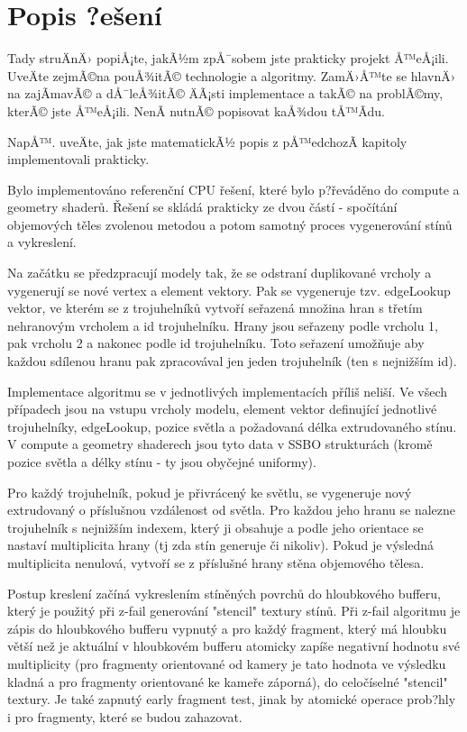 \documentclass[a4paper, 12pt]{article}
\begin{document}
\section{Popis ?ešení­}

Tady struÄnÄ› popiÅ¡te, jakÃ½m zpÅ¯sobem jste prakticky projekt Å™eÅ¡ili. UveÄte zejmÃ©na pouÅ¾itÃ©
technologie a algoritmy. ZamÄ›Å™te se hlavnÄ› na zajÃ­mavÃ© a dÅ¯leÅ¾itÃ© ÄÃ¡sti implementace a takÃ© na
problÃ©my, kterÃ© jste Å™eÅ¡ili. NenÃ­ nutnÃ© popisovat kaÅ¾dou tÅ™Ã­du.

NapÅ™. uveÄte, jak jste matematickÃ½ popis z pÅ™edchozÃ­ kapitoly implementovali prakticky.


Bylo implementováno referenční CPU řešení, které bylo p?řeváděno do compute a geometry shaderů.
Řešení se skládá prakticky ze dvou částí - spočítání objemových těles zvolenou metodou a potom
samotný proces vygenerování stínů a vykreslení.

Na začátku se předzpracují modely tak, že se odstraní duplikované vrcholy a vygenerují se nové
vertex a element vektory. Pak se vygeneruje tzv. edgeLookup vektor, ve kterém se z trojuhelníků 
vytvoří seřazená množina hran s třetím nehranovým vrcholem a id trojuhelníku. Hrany jsou seřazeny
 podle vrcholu 1, pak vrcholu 2 a nakonec podle id trojuhelníku. Toto seřazení umožňuje aby každou 
sdílenou hranu pak zpracovával jen jeden trojuhelník (ten s nejnižším id).

Implementace algoritmu se v jednotlivých implementacích příliš neliší. Ve všech případech jsou na
vstupu vrcholy modelu, element vektor definující jednotlivé trojuhelníky, edgeLookup, pozice světla a 
požadovaná délka extrudovaného stínu. V compute a geometry shaderech jsou tyto data v SSBO strukturách
(kromě pozice světla a délky stínu - ty jsou obyčejné uniformy).
 
Pro každý trojuhelník, pokud je přivrácený ke světlu, se vygeneruje nový extrudovaný o příslušnou vzdálenost
od světla. Pro každou jeho hranu se nalezne trojuhelník s nejnižším indexem, který ji obsahuje a podle
jeho orientace se nastaví multiplicita hrany (tj zda stín generuje či nikoliv).
Pokud je výsledná multiplicita nenulová, vytvoří se z příslušné hrany stěna objemového tělesa.



Postup kreslení začíná vykreslením stíněných povrchů do hloubkového bufferu, který je použitý při 
z-fail generování "stencil" textury stínů. Při z-fail algoritmu je zápis do hloubkového bufferu vypnutý
a pro každý fragment, který má hloubku větší než je aktuální v hloubkovém bufferu atomicky zapíše negativní
hodnotu své multiplicity (pro fragmenty orientované od kamery je tato hodnota ve výsledku kladná a pro
fragmenty orientované ke kameře záporná), do celočíselné "stencil" textury. Je také zapnutý early fragment test,
jinak by atomické operace prob?hly i pro fragmenty, které se budou zahazovat.
\end{document}
